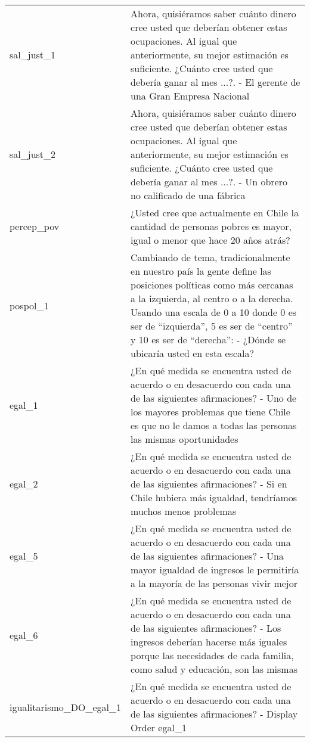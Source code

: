 \documentclass[
  10,
  landscape,
  legalpaper]{article}
\begin{document}
\begin{table}
{\begin{tabular}{l>{\raggedright\arraybackslash}p{10cm}}
sal\_just\_1 & Ahora, quisiéramos saber cuánto dinero cree usted que deberían obtener estas ocupaciones. Al igual que anteriormente, su mejor estimación es suficiente. ¿Cuánto cree usted que debería ganar al mes ...?. - El gerente de una Gran Empresa Nacional\\
sal\_just\_2 & Ahora, quisiéramos saber cuánto dinero cree usted que deberían obtener estas ocupaciones. Al igual que anteriormente, su mejor estimación es suficiente. ¿Cuánto cree usted que debería ganar al mes ...?. - Un obrero no calificado de una fábrica\\
percep\_pov & ¿Usted
cree que actualmente en Chile la cantidad de personas pobres es mayor, igual o
menor que hace 20 años atrás?\\
\addlinespace
pospol\_1 & Cambiando de tema, tradicionalmente en nuestro país la gente define las posiciones políticas como más cercanas a la izquierda, al centro o a la derecha. Usando una escala de 0 a 10 donde 0 es ser de “izquierda”, 5 es ser de “centro” y 10 es ser de “derecha”: - ¿Dónde se ubicaría usted en esta escala?\\
egal\_1 & ¿En    qué    medida    se    encuentra    usted    de    acuerdo    o    en    desacuerdo    con    cada    una    de    las    siguientes    afirmaciones? - Uno de los mayores problemas que tiene Chile es que no le damos a todas las personas las mismas oportunidades\\
egal\_2 & ¿En    qué    medida    se    encuentra    usted    de    acuerdo    o    en    desacuerdo    con    cada    una    de    las    siguientes    afirmaciones? - Si en Chile hubiera más igualdad, tendríamos muchos menos problemas\\
egal\_5 & ¿En    qué    medida    se    encuentra    usted    de    acuerdo    o    en    desacuerdo    con    cada    una    de    las    siguientes    afirmaciones? - Una mayor igualdad de ingresos le permitiría a la mayoría de las personas vivir mejor\\
egal\_6 & ¿En    qué    medida    se    encuentra    usted    de    acuerdo    o    en    desacuerdo    con    cada    una    de    las    siguientes    afirmaciones? - Los ingresos deberían hacerse más iguales porque las necesidades de cada familia, como salud y educación, son las mismas\\
\addlinespace
igualitarismo\_DO\_egal\_1 & ¿En    qué    medida    se    encuentra    usted    de    acuerdo    o    en    desacuerdo    con    cada    una    de    las    siguientes    afirmaciones? - Display Order egal\_1\\

\end{tabular}}
\end{table}
\end{document}
